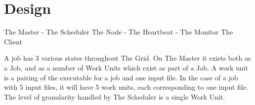 \chapter{Design}
The Master - The Scheduler
The Node - The Heartbeat - The Monitor
The Client

A job has 3 various states throughout The Grid. On The Master it exists both as a Job, and as a number of Work Units which exist as part of a Job. A work unit is a pairing of the executable for a job and one input file. In the case of a job with 5 input files, it will have 5 work units, each corresponding to one input file. The level of granularity handled by The Scheduler is a single Work Unit.
